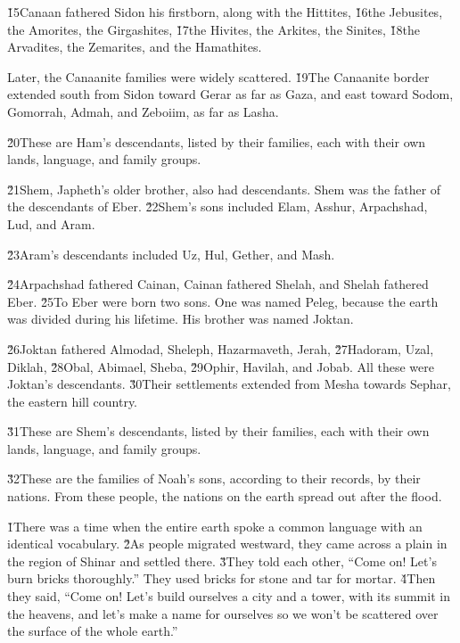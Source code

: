 \v{15}Canaan fathered Sidon his firstborn, along with the Hittites, \v{16}the Jebusites, the Amorites, the Girgashites, \v{17}the Hivites, the Arkites, the Sinites, \v{18}the Arvadites, the Zemarites, and the Hamathites.

Later, the Canaanite families were widely scattered. \v{19}The Canaanite border extended south from Sidon toward Gerar as far as Gaza, and east toward Sodom, Gomorrah, Admah, and Zeboiim, as far as Lasha.

\v{20}These are Ham's descendants, listed by their families, each with their own lands, language, and family groups.

\v{21}Shem, Japheth's older brother, also had descendants. Shem was the father of the descendants of Eber. \v{22}Shem's sons included Elam, Asshur, Arpachshad, Lud, and Aram.

\v{23}Aram's descendants included Uz, Hul, Gether, and Mash.

\v{24}Arpachshad fathered Cainan, Cainan fathered Shelah, and Shelah fathered Eber. \v{25}To Eber were born two sons. One was named Peleg, because the earth was divided during his lifetime. His brother was named Joktan.

\v{26}Joktan fathered Almodad, Sheleph, Hazarmaveth, Jerah, \v{27}Hadoram, Uzal, Diklah, \v{28}Obal, Abimael, Sheba, \v{29}Ophir, Havilah, and Jobab. All these were Joktan's descendants. \v{30}Their settlements extended from Mesha towards Sephar, the eastern hill country.

\v{31}These are Shem's descendants, listed by their families, each with their own lands, language, and family groups.

\v{32}These are the families of Noah's sons, according to their records, by their nations. From these people, the nations on the earth spread out after the flood.

\v{1}There was a time when the entire earth spoke a common language with an identical vocabulary. \v{2}As people migrated westward, they came across a plain in the region of Shinar and settled there. \v{3}They told each other, ``Come on! Let's burn bricks thoroughly.'' They used bricks for stone and tar for mortar. \v{4}Then they said, ``Come on! Let's build ourselves a city and a tower, with its summit in the heavens, and let's make a name for ourselves so we won't be scattered over the surface of the whole earth.''

